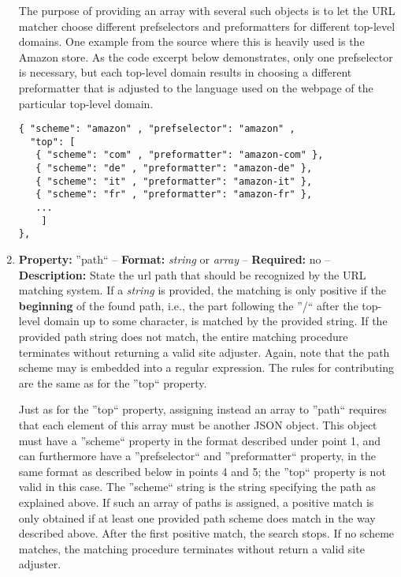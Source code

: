 \documentclass[
a4paper,
12pt,
]
{article}
\begin{document}
\begin{enumerate}
  The purpose of providing an array with several such objects is to let the URL matcher choose different prefselectors and preformatters for different top-level domains. One example from the source where this is heavily used is the Amazon store. As the code excerpt  below demonstrates, only one prefselector is necessary, but each top-level domain results in choosing a different preformatter that is adjusted to the language used on the webpage of the particular top-level domain.
   \begin{center}
\begin{lstlisting}
{ "scheme": "amazon" , "prefselector": "amazon" ,
  "top": [
   { "scheme": "com" , "preformatter": "amazon-com" },
   { "scheme": "de" , "preformatter": "amazon-de" },
   { "scheme": "it" , "preformatter": "amazon-it" },
   { "scheme": "fr" , "preformatter": "amazon-fr" },
   ...
	]
},
\end{lstlisting}
\end{center}

 \item \textbf{Property:} ''path`` -- \textbf{Format:} \textit{string} or \textit{array} -- \textbf{Required:} no -- \textbf{Description:} State the url path that should be recognized by the URL matching system. If a \textit{string} is provided, the matching is only positive if the \textbf{beginning} of the found path, i.e., the part following the ''/`` after the top-level domain up to some character, is matched by the provided string. If the provided path string does not match, the entire matching procedure terminates without returning a valid site adjuster.
 Again, note that the path scheme may is embedded into a regular expression. The rules for contributing are the same as for the ''top`` property.\par
  
  Just as for the ''top`` property, assigning instead an array to ''path`` requires that each element of this array must be another JSON object. This object must have a ''scheme`` property in the format described under point 1, and can furthermore have a ''prefselector`` and ''preformatter`` property, in the same format as described below in points 4 and 5; the ''top`` property is not valid in this case. 
  The ''scheme`` string is the string specifying the path as explained above. If such an array of paths is assigned, a positive match is only obtained if at least one provided path scheme does match in the way described above. After the first positive match, the search stops. If no scheme matches, the matching procedure terminates without return a valid site adjuster.\par
  

\end{enumerate}
\end{document}
